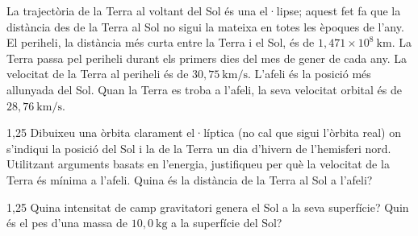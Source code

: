 La trajectòria de la Terra al voltant del Sol és una el·lipse; aquest fet fa que la distància des de la Terra al Sol no sigui la mateixa en totes les èpoques de l'any. El periheli, la distància més curta entre la Terra i el Sol, és de $1,471\times 10^{8}\ \mathrm{km}$. La Terra passa pel periheli durant els primers dies del mes de gener de cada any. La velocitat de la Terra al periheli és de $30,75\ \mathrm{km/s}$. L'afeli és la posició més allunyada del Sol. Quan la Terra es troba a l'afeli, la seva velocitat orbital és de $28,76\ \mathrm{km/s}$.

\begin{apartat}{1,25}
Dibuixeu una òrbita clarament el·líptica (no cal que sigui l'òrbita real) on s'indiqui la posició del Sol i la de la Terra un dia d'hivern de l'hemisferi nord. Utilitzant arguments basats en l'energia, justifiqueu per què la velocitat de la Terra és mínima a l'afeli. Quina és la distància de la Terra al Sol a l'afeli?
\end{apartat}

\begin{apartat}{1,25}
Quina intensitat de camp gravitatori genera el Sol a la seva superfície? Quin és el pes d'una massa de $10,0\ \mathrm{kg}$ a la superfície del Sol?
\end{apartat}

